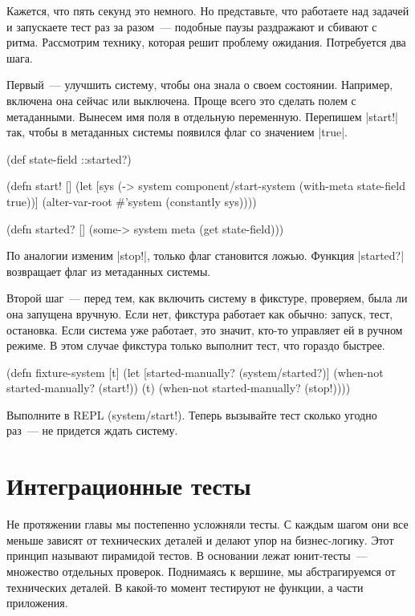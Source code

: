 Кажется, что пять секунд это немного. Но представьте, что работаете над задачей
и запускаете тест раз за разом~--- подобные паузы раздражают и сбивают с
ритма. Рассмотрим технику, которая решит проблему ожидания. Потребуется два
шага.

Первый~--- улучшить систему, чтобы она знала о своем состоянии. Например,
включена она сейчас или выключена. Проще всего это сделать полем с
метаданными. Вынесем имя поля в отдельную переменную. Перепишем \spverb|start!|
так, чтобы в метаданных системы появился флаг со значением \spverb|true|.

\begin{english}
  \begin{clojure}
(def state-field ::started?)

(defn start! []
  (let [sys (-> system
                component/start-system
                (with-meta {state-field true}))]
    (alter-var-root #'system (constantly sys))))

(defn started? []
  (some-> system meta (get state-field)))
  \end{clojure}
\end{english}

По аналогии изменим \spverb|stop!|, только флаг становится ложью. Функция
\spverb|started?| возвращает флаг из метаданных системы.

Второй шаг~--- перед тем, как включить систему в фикстуре, проверяем, была ли
она запущена вручную. Если нет, фикстура работает как обычно: запуск, тест,
остановка. Если система уже работает, это значит, кто-то управляет ей в ручном
режиме. В этом случае фикстура только выполнит тест, что гораздо быстрее.

\begin{english}
  \begin{clojure}
(defn fixture-system [t]
  (let [started-manually? (system/started?)]
    (when-not started-manually?
      (start!))
    (t)
    (when-not started-manually?
      (stop!))))
  \end{clojure}
\end{english}

Выполните в REPL (system/start!). Теперь вызывайте тест сколько угодно раз~---
не придется ждать систему.

\section{Интеграционные тесты}

Не протяжении главы мы постепенно усложняли тесты. С каждым шагом они все меньше
зависят от технических деталей и делают упор на бизнес-логику. Этот принцип
называют пирамидой тестов. В основании лежат юнит-тесты~--- множество отдельных
проверок. Поднимаясь к вершине, мы абстрагируемся от технических деталей. В
какой-то момент тестируют не функции, а части приложения.

